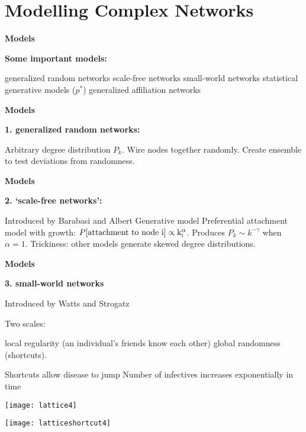 
\section{Modelling Complex Networks}

  \textbf{Models}

  \textbf{Some important models:}
    
     generalized random networks
     scale-free networks
     small-world networks
     statistical generative models ($p^\ast$)
     generalized affiliation networks
    
  
  

  \textbf{Models}

  \textbf{1. generalized random networks:}
    
     Arbitrary degree distribution $P_k$.
     Wire nodes together randomly.
     Create ensemble to test deviations from randomness.
    
  
  

  \textbf{Models}

  \textbf{2. `scale-free networks':}
    
     Introduced by Barabasi and Albert\cite{barabasi1999a}
     Generative model
     Preferential attachment model with growth:
      $P[\rm \mbox{attachment to node}\ i] \propto k_{i}^\alpha$.
     Produces \alert{$P_k \sim k^{-\gamma}$} when $\alpha=1$.
     Trickiness: other models generate skewed degree distributions.
    
  


  \textbf{Models}

  \textbf{3. small-world networks}
    
     Introduced by Watts and Strogatz\cite{watts1998a}
    
    \medskip
    {Two scales:}
    
     \alert{local regularity} (an individual's friends know each other)
     \alert{global randomness} (shortcuts).
    

          
      
       Shortcuts allow disease to jump
       Number of infectives increases exponentially in time
      
      
              
        
        \texttt{[image: lattice4]}
        
        \texttt{[image: latticeshortcut4]}
            
